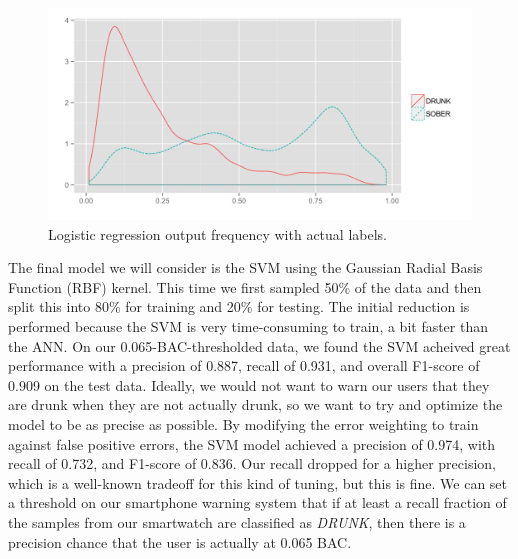 \begin{figure}
	\includegraphics[width=1.0\textwidth]{../figs/log_pred_density}
	\caption{Logistic regression output frequency with actual labels.}
	\label{fig:log_pred_density}
\end{figure}

The final model we will consider is the SVM using the Gaussian Radial Basis Function (RBF) kernel. This time we first sampled 50\% of the data and then split this into 80\% for training and 20\% for testing. The initial reduction is performed because the SVM is very time-consuming to train, a bit faster than the ANN. On our 0.065-BAC-thresholded data, we found the SVM acheived great performance with a precision of 0.887, recall of 0.931, and overall F1-score of 0.909 on the test data. Ideally, we would not want to warn our users that they are drunk when they are not actually drunk, so we want to try and optimize the model to be as precise as possible. By modifying the error weighting to train against false positive errors, the SVM model achieved a precision of 0.974, with recall of 0.732, and F1-score of 0.836. Our recall dropped for a higher precision, which is a well-known tradeoff for this kind of tuning, but this is fine. We can set a threshold on our smartphone warning system that if at least a recall fraction of the samples from our smartwatch are classified as \textit{DRUNK}, then there is a precision chance that the user is actually at 0.065 BAC.